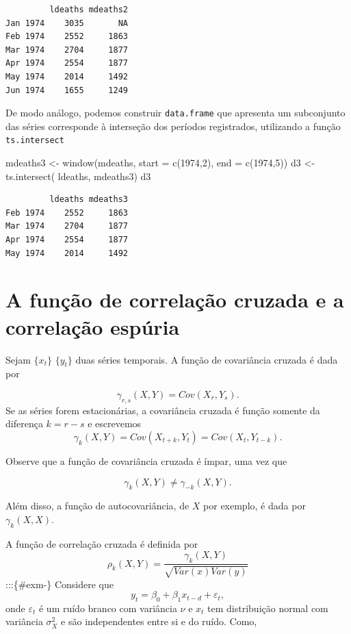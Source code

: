 \documentclass[
  letterpaper,
  DIV=11,
  numbers=noendperiod]{scrartcl}
\newenvironment{Shaded}{\begin{snugshade}}{\end{snugshade}}
\newcommand{\AttributeTok}[1]{\textcolor[rgb]{0.40,0.45,0.13}{#1}}
\newcommand{\DecValTok}[1]{\textcolor[rgb]{0.68,0.00,0.00}{#1}}
\newcommand{\FunctionTok}[1]{\textcolor[rgb]{0.28,0.35,0.67}{#1}}
\newcommand{\NormalTok}[1]{\textcolor[rgb]{0.00,0.23,0.31}{#1}}
\newcommand{\OtherTok}[1]{\textcolor[rgb]{0.00,0.23,0.31}{#1}}
\theoremstyle{definition}
\theoremstyle{definition}
\theoremstyle{plain}
\theoremstyle{plain}
\theoremstyle{remark}
\begin{document}
\begin{verbatim}
         ldeaths mdeaths2
Jan 1974    3035       NA
Feb 1974    2552     1863
Mar 1974    2704     1877
Apr 1974    2554     1877
May 1974    2014     1492
Jun 1974    1655     1249
\end{verbatim}

De modo análogo, podemos construir \texttt{data.frame} que apresenta um
subconjunto das séries corresponde à interseção dos períodos
registrados, utilizando a função \texttt{ts.intersect}

\begin{Shaded}
\begin{Highlighting}[]
\NormalTok{mdeaths3 }\OtherTok{\textless{}{-}} \FunctionTok{window}\NormalTok{(mdeaths, }\AttributeTok{start =} \FunctionTok{c}\NormalTok{(}\DecValTok{1974}\NormalTok{,}\DecValTok{2}\NormalTok{), }\AttributeTok{end =} \FunctionTok{c}\NormalTok{(}\DecValTok{1974}\NormalTok{,}\DecValTok{5}\NormalTok{))}
\NormalTok{d3 }\OtherTok{\textless{}{-}} \FunctionTok{ts.intersect}\NormalTok{( ldeaths, mdeaths3)}
\NormalTok{d3}
\end{Highlighting}
\end{Shaded}

\begin{verbatim}
         ldeaths mdeaths3
Feb 1974    2552     1863
Mar 1974    2704     1877
Apr 1974    2554     1877
May 1974    2014     1492
\end{verbatim}

\section{A função de correlação cruzada e a correlação
espúria}\label{a-funuxe7uxe3o-de-correlauxe7uxe3o-cruzada-e-a-correlauxe7uxe3o-espuxfaria}

Sejam \(\{x_t\}\) \(\{y_t\}\) duas séries temporais. A função de
covariância cruzada é dada por

\[\gamma_{r,s}(X,Y)=Cov(X_r,Y_s).\] Se as séries forem estacionárias, a
covariância cruzada é função somente da diferença \(k=r-s\) e escrevemos
\[\gamma_{k}(X,Y)=Cov(X_{t+k},Y_t)=Cov(X_{t},Y_{t-k}).\]

Observe que a função de covariância cruzada é ímpar, uma vez que

\[\gamma_{k}(X,Y)\neq \gamma_{-k}(X,Y).\]

Além disso, a função de autocovariância, de \(X\) por exemplo, é dada
por \(\gamma_k(X,X)\).

A função de correlação cruzada é definida por
\[\rho_k(X,Y)=\frac{\gamma_{k}(X,Y)}{\sqrt{Var(x)Var(y)}}\]
:::\{\#exm-\} Considere que
\[y_t = \beta_0+\beta_1 x_{t-d}+\varepsilon_t,\] onde \(\varepsilon_t\)
é um ruído branco com variância \(\nu\) e \(x_t\) tem distribuição
normal com variância \(\sigma^2_X\) e são independentes entre si e do
ruído. Como,
\end{document}
